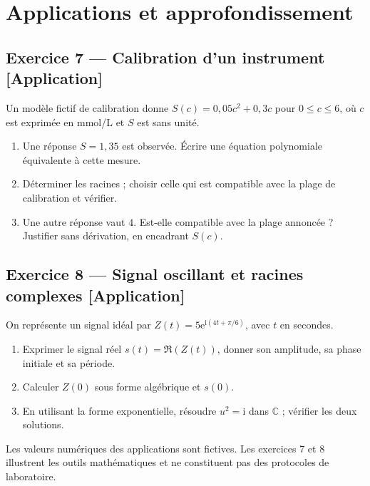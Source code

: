 \documentclass[11pt,a4paper,oneside]{article}
\newcommand{\exo}[3]{%
  \Needspace{6\baselineskip}%
  \subsection*{Exercice #1 --- #3 \hfill
  {\normalfont\footnotesize\color{GrisTexte}[#2]}}}
\newcommand{\C}{\mathbb C}
\newcommand{\ii}{\mathrm i}
\newcommand{\ee}{\mathrm e}
\begin{document}
\section{Applications et approfondissement}
\exo{7}{Application}{Calibration d'un instrument}
Un modèle fictif de calibration donne $S(c)=0{,}05c^2+0{,}3c$ pour $0\le c\le6$, où $c$ est exprimée en mmol/L et $S$ est sans unité.
\begin{enumerate}[label=\alph*)]
\item Une réponse $S=1{,}35$ est observée. Écrire une équation polynomiale équivalente à cette mesure.
\item Déterminer les racines ; choisir celle qui est compatible avec la plage de calibration et vérifier.
\item Une autre réponse vaut $4$. Est-elle compatible avec la plage annoncée ? Justifier sans dérivation, en encadrant $S(c)$.
\end{enumerate}
\exo{8}{Application}{Signal oscillant et racines complexes}
On représente un signal idéal par $Z(t)=5\ee^{\ii(4t+\pi/6)}$, avec $t$ en secondes.
\begin{enumerate}[label=\alph*)]
\item Exprimer le signal réel $s(t)=\Re(Z(t))$, donner son amplitude, sa phase initiale et sa période.
\item Calculer $Z(0)$ sous forme algébrique et $s(0)$.
\item En utilisant la forme exponentielle, résoudre $u^2=\ii$ dans $\C$ ; vérifier les deux solutions.
\end{enumerate}
\begin{conseilbox}Les valeurs numériques des applications sont fictives. Les exercices 7 et 8 illustrent les outils mathématiques et ne constituent pas des protocoles de laboratoire.
\end{conseilbox}
\end{document}
